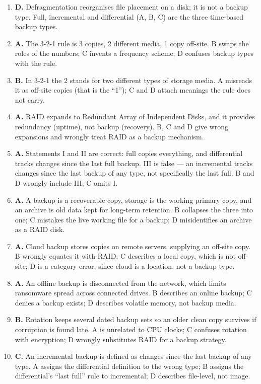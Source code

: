 \begin{enumerate}[label=\textbf{Q\arabic*.}, leftmargin=*]
  confuses file-level backup with RAID.
\item \textbf{D.} Defragmentation reorganises file placement on a disk; it is
  not a backup type. Full, incremental and differential (A, B, C) are the
  three time-based backup types.
\item \textbf{A.} The 3-2-1 rule is 3 copies, 2 different media, 1 copy
  off-site. B swaps the roles of the numbers; C invents a frequency scheme; D
  confuses backup types with the rule.
\item \textbf{B.} In 3-2-1 the 2 stands for two different types of storage
  media. A misreads it as off-site copies (that is the ``1''); C and D attach
  meanings the rule does not carry.
\item \textbf{A.} RAID expands to Redundant Array of Independent Disks, and it
  provides redundancy (uptime), not backup (recovery). B, C and D give wrong
  expansions and wrongly treat RAID as a backup mechanism.
\item \textbf{A.} Statements I and II are correct: full copies everything, and
  differential tracks changes since the last full backup. III is false --- an
  incremental tracks changes since the last backup of any type, not
  specifically the last full. B and D wrongly include III; C omits I.
\item \textbf{A.} A backup is a recoverable copy, storage is the working
  primary copy, and an archive is old data kept for long-term retention. B
  collapses the three into one; C mistakes the live working file for a
  backup; D misidentifies an archive as a RAID disk.
\item \textbf{A.} Cloud backup stores copies on remote servers, supplying an
  off-site copy. B wrongly equates it with RAID; C describes a local copy,
  which is not off-site; D is a category error, since cloud is a location,
  not a backup type.
\item \textbf{A.} An offline backup is disconnected from the network, which
  limits ransomware spread across connected drives. B describes an online
  backup; C denies a backup exists; D describes volatile memory, not backup
  media.
\item \textbf{B.} Rotation keeps several dated backup sets so an older clean
  copy survives if corruption is found late. A is unrelated to CPU clocks; C
  confuses rotation with encryption; D wrongly substitutes RAID for a backup
  strategy.
\item \textbf{C.} An incremental backup is defined as changes since the last
  backup of any type. A assigns the differential definition to the wrong
  type; B assigns the differential's ``last full'' rule to incremental; D
  describes file-level, not image.


\end{enumerate}
